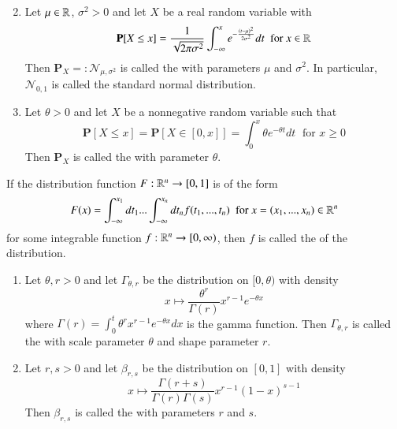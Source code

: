 \documentclass[12pt, a4paper, oneside, openright, titlepage]{book}
\begin{document}
\begin{eg}
\begin{enumerate}[label=\roman*]
\begin{equation*}
            \end{equation*}
        \item Let $\mu \in \mathbb R$, $\sigma^2 > 0$ and let $X$ be a real random variable with \begin{equation*}
                \mathbf{P}[X\leq x] = \frac{1}{\sqrt{2\pi\sigma^2}}\int_{-\infty}^xe^{-\frac{(t-\mu)^2}{2\sigma^2}}dt\;\text{ for } x \in \mathbb R
        \end{equation*}
            Then $\mathbf{P}_X =: \mathcal{N}_{\mu,\sigma^2}$ is called the  with parameters $\mu$ and $\sigma^2$. In particular, $\mathcal{N}_{0,1}$ is called the standard normal distribution.
        \item Let $\theta > 0$ and let $X $ be a nonnegative random variable such that \begin{equation*}
                \mathbf{P}[X\leq x] = \mathbf{P}[X \in [0,x]] = \int_0^x\theta e^{-\theta t}dt\;\text{ for } x \geq 0
        \end{equation*}
            Then $\mathbf{P}_X$ is called the  with parameter $\theta$.
    \end{enumerate}
\end{eg}

\begin{defn}
    If the distribution function $F:\mathbb R^n\rightarrow [0,1]$ is of the form \begin{equation*}
        F(x) = \int_{-\infty}^{x_1}dt_1...\int_{-\infty}^{x_n}dt_nf(t_1,...,t_n) \;\text{ for } x = (x_1,...,x_n) \in \mathbb R^n
    \end{equation*}
    for some integrable function $f:\mathbb R^n\rightarrow [0,\infty)$, then $f$ is called the  of the distribution.
\end{defn}

\begin{eg}
    \leavevmode
    \begin{enumerate}[label=\roman*]
        \item Let $\theta, r > 0$ and let $\Gamma_{\theta,r}$ be the distribution on $[0,\theta)$ with density \begin{equation*}
                x\mapsto \frac{\theta^r}{\Gamma(r)}x^{r-1}e^{-\theta x}
        \end{equation*}
            where $\Gamma(r) = \int_0^{t}\theta^rx^{r-1}e^{-\theta x}dx$ is the gamma function. Then $\Gamma_{\theta,r}$ is called the  with scale parameter $\theta$ and shape parameter $r$.
        \item Let $r,s > 0$ and let $\beta_{r,s}$ be the distribution on $[0,1]$ with density \begin{equation*}
                x\mapsto \frac{\Gamma(r+s)}{\Gamma(r)\Gamma(s)}x^{r-1}(1-x)^{s-1}
        \end{equation*}
            Then $\beta_{r,s}$ is called the  with parameters $r$ and $s$.
    \end{enumerate}
\end{eg}
\end{document}
